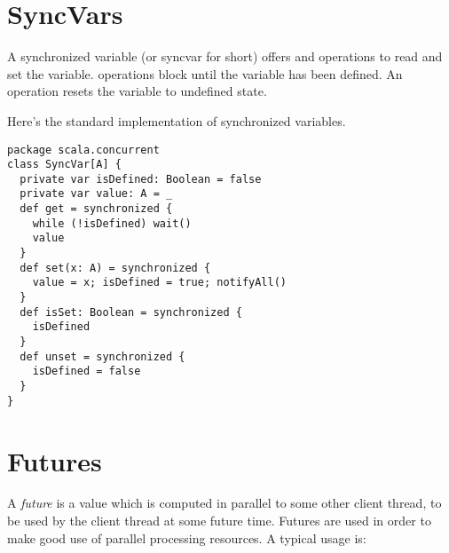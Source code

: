 
\section{SyncVars}

A synchronized variable (or syncvar for short) offers  and
 operations to read and set the variable.  operations
block until the variable has been defined. An  operation
resets the variable to undefined state.

Here's the standard implementation of synchronized variables.
\begin{lstlisting}
package scala.concurrent
class SyncVar[A] {
  private var isDefined: Boolean = false
  private var value: A = _
  def get = synchronized {
    while (!isDefined) wait()
    value
  }
  def set(x: A) = synchronized {
    value = x; isDefined = true; notifyAll()
  }
  def isSet: Boolean = synchronized {
    isDefined
  }
  def unset = synchronized {
    isDefined = false
  }
}
\end{lstlisting}

\section{Futures}
\label{sec:futures}

A {\em future} is a value which is computed in parallel to some other
client thread, to be used by the client thread at some future time.
Futures are used in order to make good use of parallel processing
resources.  A typical usage is:

